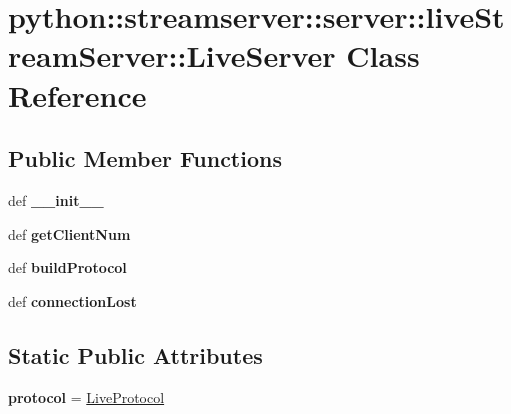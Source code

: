 \hypertarget{classpython_1_1streamserver_1_1server_1_1liveStreamServer_1_1LiveServer}{
\section{python::streamserver::server::liveStreamServer::LiveServer Class Reference}
\label{classpython_1_1streamserver_1_1server_1_1liveStreamServer_1_1LiveServer}
}
\subsection*{Public Member Functions}
\begin{DoxyCompactItemize}
\item 
\hypertarget{classpython_1_1streamserver_1_1server_1_1liveStreamServer_1_1LiveServer_a8ce5d7732b79eb00ff858f6a534379cd}{
def {\bfseries \_\-\_\-init\_\-\_\-}}
\label{classpython_1_1streamserver_1_1server_1_1liveStreamServer_1_1LiveServer_a8ce5d7732b79eb00ff858f6a534379cd}

\item 
\hypertarget{classpython_1_1streamserver_1_1server_1_1liveStreamServer_1_1LiveServer_a4f89db5ba67e4935ef1bee02747bf471}{
def {\bfseries getClientNum}}
\label{classpython_1_1streamserver_1_1server_1_1liveStreamServer_1_1LiveServer_a4f89db5ba67e4935ef1bee02747bf471}

\item 
\hypertarget{classpython_1_1streamserver_1_1server_1_1liveStreamServer_1_1LiveServer_a3eb0b689e1f37e02767f331f6b7adf2a}{
def {\bfseries buildProtocol}}
\label{classpython_1_1streamserver_1_1server_1_1liveStreamServer_1_1LiveServer_a3eb0b689e1f37e02767f331f6b7adf2a}

\item 
\hypertarget{classpython_1_1streamserver_1_1server_1_1liveStreamServer_1_1LiveServer_a5d19a7865163749a162f98f79442f7fc}{
def {\bfseries connectionLost}}
\label{classpython_1_1streamserver_1_1server_1_1liveStreamServer_1_1LiveServer_a5d19a7865163749a162f98f79442f7fc}

\end{DoxyCompactItemize}
\subsection*{Static Public Attributes}
\begin{DoxyCompactItemize}
\item 
\hypertarget{classpython_1_1streamserver_1_1server_1_1liveStreamServer_1_1LiveServer_a48cef0fd3f41dc26c8020667cffffe33}{
{\bfseries protocol} = \hyperlink{classpython_1_1streamserver_1_1server_1_1liveStreamServer_1_1LiveProtocol}{LiveProtocol}}
\label{classpython_1_1streamserver_1_1server_1_1liveStreamServer_1_1LiveServer_a48cef0fd3f41dc26c8020667cffffe33}

\end{DoxyCompactItemize}


